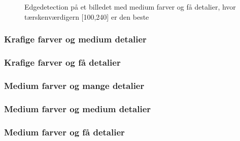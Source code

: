 \begin{figure}[!h]
    \centering
    \\
    \\
        \caption[]{Edgedetection på et billedet med medium farver og få detalier, hvor tærskenværdigern [100,240] er den beste}
     \label{2}
\end{figure}


\subsubsection{Krafige farver og medium detalier}
\subsubsection{Krafige farver og få detalier}
\subsubsection{Medium farver og mange detalier}
\subsubsection{Medium farver og medium detalier}
\subsubsection{Medium farver og få detalier}
